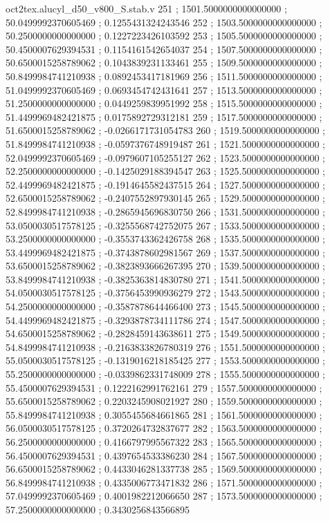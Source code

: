 \begin{filecontents}[overwrite]{oct2tex.alucyl_d50_v800_S.stab.v}
251 ; 1501.5000000000000000 ; 50.0499992370605469 ; 0.1255431324243546
252 ; 1503.5000000000000000 ; 50.2500000000000000 ; 0.1227223426103592
253 ; 1505.5000000000000000 ; 50.4500007629394531 ; 0.1154161542654037
254 ; 1507.5000000000000000 ; 50.6500015258789062 ; 0.1043839231133461
255 ; 1509.5000000000000000 ; 50.8499984741210938 ; 0.0892453417181969
256 ; 1511.5000000000000000 ; 51.0499992370605469 ; 0.0693454742431641
257 ; 1513.5000000000000000 ; 51.2500000000000000 ; 0.0449259839951992
258 ; 1515.5000000000000000 ; 51.4499969482421875 ; 0.0175892729312181
259 ; 1517.5000000000000000 ; 51.6500015258789062 ; -0.0266171731054783
260 ; 1519.5000000000000000 ; 51.8499984741210938 ; -0.0597376748919487
261 ; 1521.5000000000000000 ; 52.0499992370605469 ; -0.0979607105255127
262 ; 1523.5000000000000000 ; 52.2500000000000000 ; -0.1425029188394547
263 ; 1525.5000000000000000 ; 52.4499969482421875 ; -0.1914645582437515
264 ; 1527.5000000000000000 ; 52.6500015258789062 ; -0.2407552897930145
265 ; 1529.5000000000000000 ; 52.8499984741210938 ; -0.2865945696830750
266 ; 1531.5000000000000000 ; 53.0500030517578125 ; -0.3255568742752075
267 ; 1533.5000000000000000 ; 53.2500000000000000 ; -0.3553743362426758
268 ; 1535.5000000000000000 ; 53.4499969482421875 ; -0.3743878602981567
269 ; 1537.5000000000000000 ; 53.6500015258789062 ; -0.3823893666267395
270 ; 1539.5000000000000000 ; 53.8499984741210938 ; -0.3825363814830780
271 ; 1541.5000000000000000 ; 54.0500030517578125 ; -0.3756453990936279
272 ; 1543.5000000000000000 ; 54.2500000000000000 ; -0.3587878644466400
273 ; 1545.5000000000000000 ; 54.4499969482421875 ; -0.3293878734111786
274 ; 1547.5000000000000000 ; 54.6500015258789062 ; -0.2828459143638611
275 ; 1549.5000000000000000 ; 54.8499984741210938 ; -0.2163833826780319
276 ; 1551.5000000000000000 ; 55.0500030517578125 ; -0.1319016218185425
277 ; 1553.5000000000000000 ; 55.2500000000000000 ; -0.0339862331748009
278 ; 1555.5000000000000000 ; 55.4500007629394531 ; 0.1222162991762161
279 ; 1557.5000000000000000 ; 55.6500015258789062 ; 0.2203245908021927
280 ; 1559.5000000000000000 ; 55.8499984741210938 ; 0.3055455684661865
281 ; 1561.5000000000000000 ; 56.0500030517578125 ; 0.3720264732837677
282 ; 1563.5000000000000000 ; 56.2500000000000000 ; 0.4166797995567322
283 ; 1565.5000000000000000 ; 56.4500007629394531 ; 0.4397654533386230
284 ; 1567.5000000000000000 ; 56.6500015258789062 ; 0.4433046281337738
285 ; 1569.5000000000000000 ; 56.8499984741210938 ; 0.4335006773471832
286 ; 1571.5000000000000000 ; 57.0499992370605469 ; 0.4001982212066650
287 ; 1573.5000000000000000 ; 57.2500000000000000 ; 0.3430256843566895

\end{filecontents}
